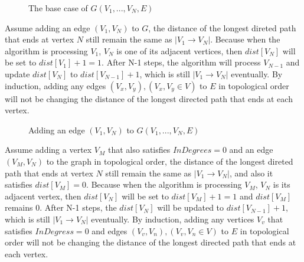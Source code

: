 \documentclass[11pt]{article}
\theoremstyle{definition}
\begin{document}
\begin{enumerate}
\begin{figure}[htbp]
\centering
{}
\caption{\label{fig: } The base case of $G(V_1,...,V_N, E)$}
\end{figure}
Assume adding an edge $(V_1,V_N)$ to $G$, the distance of the longest direted path that ends at vertex $N$ still remain the same as $|V_1 \to V_N|$. Because when the algorithm is processing $V_1$, $V_N$ is one of its adjacent vertices, then $dist[V_N]$ will be set to $dist[V_1]+1=1$. After N-1 steps, the algorithm will process $V_{N-1}$ and update $dist[V_N]$ to $dist[V_{N-1}]+1$, which is still $|V_1 \to V_N|$ eventually. By induction, adding any edges $(V_x,V_y), (V_x, V_y \in V)$ to $E$ in topological order will not be changing the distance of the longest directed path that ends at each vertex.
\begin{figure}[htbp]
\centering
{}
\caption{\label{fig: } Adding an edge $(V_1,V_N)$ to $G(V_1,...,V_N, E)$}
\end{figure}

Assume adding a vertex $V_M$ that also satisfies $InDegrees=0$ and an edge $(V_M,V_N)$ to the graph in topological order, the distance of the longest direted path that ends at vertex $N$ still remain the same as $|V_1 \to V_N|$, and also it satisfies $dist[V_M]=0$. Because when the algorithm is processing $V_M$, $V_N$ is its adjacent vertex, then $dist[V_N]$ will be set to $dist[V_M]+1=1$ and $dist[V_M]$ remains 0. After N-1 steps, the $dist[V_N]$ will be updated to $dist[V_{N-1}]+1$, which is still $|V_1 \to V_N|$ eventually. By induction, adding any vertices $V_v$ that satisfies $InDegress=0$ and edges $(V_v,V_n), (V_v, V_n \in V)$ to $E$ in topological order will not be changing the distance of the longest directed path that ends at each vertex.


\end{enumerate}
\end{document}
